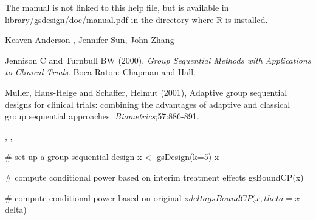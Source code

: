 \begin{Note}\relax
The manual is not linked to this help file, but is available in library/gsdesign/doc/manual.pdf
in the directory where R is installed.
\end{Note}
\begin{Author}\relax
Keaven Anderson , Jennifer Sun, John Zhang
\end{Author}
\begin{References}\relax
Jennison C and Turnbull BW (2000), \emph{Group Sequential Methods with Applications to Clinical Trials}.
Boca Raton: Chapman and Hall.

Muller, Hans-Helge and Schaffer, Helmut (2001), Adaptive group sequential designs for clinical trials:
combining the advantages of adaptive and classical group sequential approaches. \emph{Biometrics};57:886-891.
\end{References}
\begin{SeeAlso}\relax
{}, , 
\end{SeeAlso}
\begin{Examples}
\begin{ExampleCode}
# set up a group sequential design
x <- gsDesign(k=5)
x

# compute conditional power based on interim treatment effects
gsBoundCP(x)

# compute conditional power based on original x$delta
gsBoundCP(x, theta=x$delta)
\end{ExampleCode}
\end{Examples}

